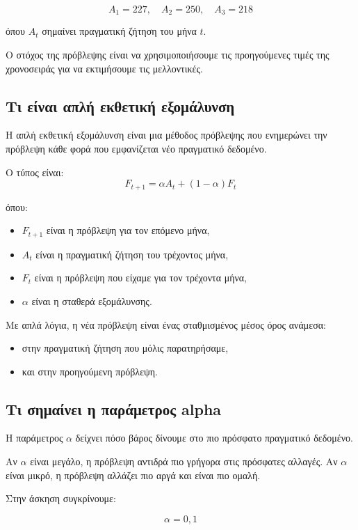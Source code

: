 \documentclass[12pt,a4paper]{article}
\begin{document}
\[
A_1=227,\quad A_2=250,\quad A_3=218
\]

όπου \(A_t\) σημαίνει πραγματική ζήτηση του μήνα \(t\).

Ο στόχος της πρόβλεψης είναι να χρησιμοποιήσουμε τις προηγούμενες τιμές της χρονοσειράς για να εκτιμήσουμε τις μελλοντικές.

\subsection{Τι είναι απλή εκθετική εξομάλυνση}

Η απλή εκθετική εξομάλυνση είναι μια μέθοδος πρόβλεψης που ενημερώνει την πρόβλεψη κάθε φορά που εμφανίζεται νέο πραγματικό δεδομένο.

Ο τύπος είναι:
\[
F_{t+1}=\alpha A_t+(1-\alpha)F_t
\]

όπου:

\begin{itemize}
    \item \(F_{t+1}\) είναι η πρόβλεψη για τον επόμενο μήνα,
    \item \(A_t\) είναι η πραγματική ζήτηση του τρέχοντος μήνα,
    \item \(F_t\) είναι η πρόβλεψη που είχαμε για τον τρέχοντα μήνα,
    \item \(\alpha\) είναι η σταθερά εξομάλυνσης.
\end{itemize}

Με απλά λόγια, η νέα πρόβλεψη είναι ένας σταθμισμένος μέσος όρος ανάμεσα:

\begin{itemize}
    \item στην πραγματική ζήτηση που μόλις παρατηρήσαμε,
    \item και στην προηγούμενη πρόβλεψη.
\end{itemize}

\subsection{Τι σημαίνει η παράμετρος alpha}

Η παράμετρος \(\alpha\) δείχνει πόσο βάρος δίνουμε στο πιο πρόσφατο πραγματικό δεδομένο.

Αν \(\alpha\) είναι μεγάλο, η πρόβλεψη αντιδρά πιο γρήγορα στις πρόσφατες αλλαγές. Αν \(\alpha\) είναι μικρό, η πρόβλεψη αλλάζει πιο αργά και είναι πιο ομαλή.

Στην άσκηση συγκρίνουμε:

\[
\alpha=0{,}1
\]
\end{document}
